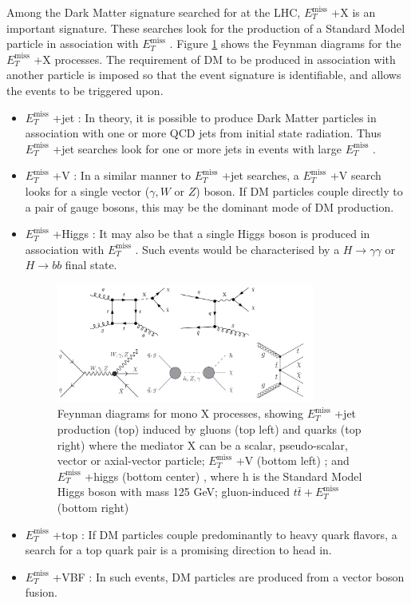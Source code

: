 \documentclass[11pt,a4paper,openright,twoside]{report}
\newcommand{\met}{$E_T^{\mathrm{miss}}$ }
\begin{document}
Among the Dark Matter signature searched for at the LHC, \met+X is an important signature. These searches look for the production of a Standard Model particle in association with \met. Figure \ref{fig:Mono_X} shows the Feynman diagrams for the \met+X processes. The requirement of DM to be produced in association with another particle is imposed so that the event signature is identifiable, and allows the events to be triggered upon.
\begin{itemize}

\item \met+jet : In theory, it is possible to produce Dark Matter particles in association with one or more QCD jets from initial state radiation. Thus \met+jet searches look for one or more jets in events with large \met.
\item \met+V : In a similar manner to \met+jet searches, a \met+V search looks for a single vector ($\gamma,W$ or $Z$) boson. If DM particles couple directly to a pair of gauge bosons, this may be the dominant mode of DM production.
\item \met+Higgs : It may also be that a single Higgs boson is produced in association with \met. Such events would be characterised by a $H\to\gamma\gamma$ or $H\to bb$ final state.
	
\begin{figure}[H]
\centering
\includegraphics[width=0.8\textwidth]{Mono_X.png}
\caption{Feynman diagrams for mono X processes, showing \met +jet production (top) induced by gluons (top left) and quarks (top right) \cite{mono_j} where the mediator X can be a scalar, pseudo-scalar, vector or axial-vector particle; \met +V (bottom left) \cite{mono_V}; and \met +higgs (bottom center) \cite{mono_h}, where h is the Standard Model Higgs boson with mass 125 GeV; gluon-induced $t\bar{t}+$\met (bottom right)}
\label{fig:Mono_X}
\end{figure}

\item \met+top : If DM particles couple predominantly to heavy quark flavors, a search for a top quark pair is a promising direction to head in.
\item \met+VBF : In such events, DM particles are produced from a vector boson fusion.
\end{itemize}
\end{document}
